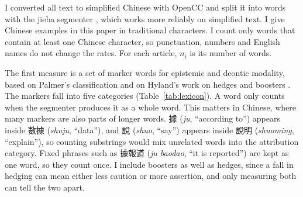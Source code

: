 \documentclass[11pt]{article}
\begin{document}
I converted all text to simplified Chinese with OpenCC and split it into words with the jieba segmenter \cite{jieba}, which works more reliably on simplified text. I give Chinese examples in this paper in traditional characters. I count only words that contain at least one Chinese character, so punctuation, numbers and English names do not change the rates. For each article, $n_i$ is its number of words.

The first measure is a set of marker words for epistemic and deontic modality, based on Palmer's classification \cite{palmer} and on Hyland's work on hedges and boosters \cite{hyland}. The markers fall into five categories (Table~\ref{tab:lexicon}). A word only counts when the segmenter produces it as a whole word. This matters in Chinese, where many markers are also parts of longer words. 據 (\textit{ju}, ``according to'') appears inside 數據 (\textit{shuju}, ``data''), and 說 (\textit{shuo}, ``say'') appears inside 說明 (\textit{shuoming}, ``explain''), so counting substrings would mix unrelated words into the attribution category. Fixed phrases such as 據報道 (\textit{ju baodao}, ``it is reported'') are kept as one word, so they count once. I include boosters as well as hedges, since a fall in hedging can mean either less caution or more assertion, and only measuring both can tell the two apart.
\end{document}
